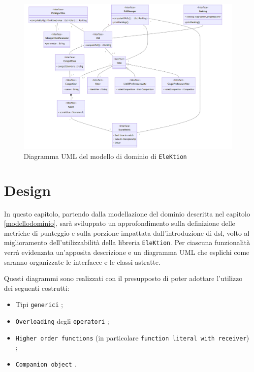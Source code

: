 \documentclass[12pt,a4paper,openright,twoside]{book}
\begin{document}
\begin{figure}
   \centering
    \includegraphics[width=1.1\linewidth]{figures/modellodominio.png}
    \caption{Diagramma UML del modello di dominio di \texttt{EleKtion}}
   \label{fig:modellodominio}
\end{figure}

\chapter{Design}
\label{designdsl}
In questo capitolo, partendo dalla modellazione del dominio descritta nel capitolo \ref{modellodominio}, 
sarà sviluppato un approfondimento sulla definizione delle metriche di punteggio e sulla porzione
impattata dall'introduzione di \ac{dsl}, volto al miglioramento dell'utilizzabilità della libreria \texttt{EleKtion}.
Per ciascuna funzionalità verrà evidenzata un'apposita descrizione e un diagramma UML
che esplichi come saranno organizzate le interfacce e le classi astratte.

Questi diagrammi sono realizzati con il presupposto di poter adottare l'utilizzo
dei seguenti costrutti:
\begin{itemize}
\item{Tipi \texttt{generici} \cite{WebsiteKotlinGenerics};}
\item{\texttt{Overloading} degli \texttt{operatori} \cite{WebsiteKotlinOperatorOverloading};}
\item{\texttt{Higher order functions} (in particolare \texttt{function literal with receiver}) \cite{WebsiteKotlinLambda};}
\item{\texttt{Companion object} \cite{WebsiteKotlinCompanionObject}.}
\end{itemize}
\end{document}
